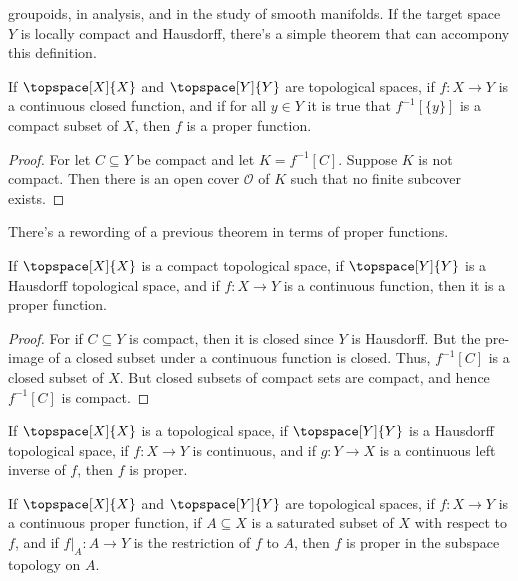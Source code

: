 \documentclass{article}                                                        %
\begin{document}
        groupoids, in analysis, and in the study of smooth manifolds. If the
        target space $Y$ is locally compact and Hausdorff, there's a simple
        theorem that can accompony this definition.
        \begin{theorem}
            If $\topspace[X]{X}$ and $\topspace[Y]{Y}$ are topological spaces,
            if $f:X\rightarrow{Y}$ is a continuous closed function, and if for
            all $y\in{Y}$ it is true that $f^{\minus{1}}[\{y\}]$ is a compact
            subset of $X$, then $f$ is a proper function.
        \end{theorem}
        \begin{proof}
            For let $C\subseteq{Y}$ be compact and let $K=f^{\minus{1}}[C]$.
            Suppose $K$ is not compact. Then there is an open cover
            $\mathcal{O}$ of $K$ such that no finite subcover exists.
        \end{proof}
        There's a rewording of a previous theorem in terms of proper functions.
        \begin{theorem}
            If $\topspace[X]{X}$ is a compact topological space, if
            $\topspace[Y]{Y}$ is a Hausdorff topological space, and if
            $f:X\rightarrow{Y}$ is a continuous function, then it is a proper
            function.
        \end{theorem}
        \begin{proof}
            For if $C\subseteq{Y}$ is compact, then it is closed since $Y$ is
            Hausdorff. But the pre-image of a closed subset under a continuous
            function is closed. Thus, $f^{\minus{1}}[C]$ is a closed subset of
            $X$. But closed subsets of compact sets are compact, and hence
            $f^{\minus{1}}[C]$ is compact.
        \end{proof}
        \begin{theorem}
            If $\topspace[X]{X}$ is a topological space, if $\topspace[Y]{Y}$
            is a Hausdorff topological space, if $f:X\rightarrow{Y}$ is
            continuous, and if $g:Y\rightarrow{X}$ is a continuous left inverse
            of $f$, then $f$ is proper.
        \end{theorem}
        \begin{theorem}
            If $\topspace[X]{X}$ and $\topspace[Y]{Y}$ are topological spaces,
            if $f:X\rightarrow{Y}$ is a continuous proper function, if
            $A\subseteq{X}$ is a saturated subset of $X$ with respect to $f$,
            and if $f|_{A}:A\rightarrow{Y}$ is the restriction of $f$ to $A$,
            then $f$ is proper in the subspace topology on $A$.
        \end{theorem}
\end{document}
